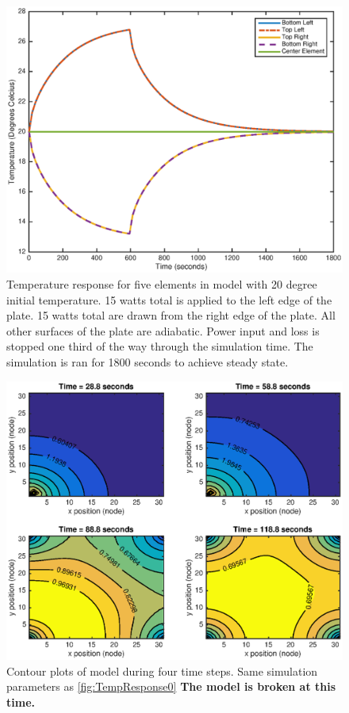\documentclass[10pt,twocolumn]{article}
\begin{document}
\begin{figure}
	\center
	\includegraphics[width=0.8\linewidth]{TmpRspn25x25,15Wleftedge,-15Wrightedge,halftime.eps}
	\caption{Temperature response for five elements in model with 20 degree initial temperature. 15 watts total is applied to the left edge of the plate. 15 watts total are drawn from the right edge of the plate. All other surfaces of the plate are adiabatic. Power input and loss is stopped one third of the way through the simulation time. The simulation is ran for 1800 seconds to achieve steady state.}
	\label{fig:TmpRspn25x25,15Wleftedge,-15Wrightedge,halftime}
\end{figure}


\begin{figure}
	\center
	\includegraphics[width=0.8\linewidth]{ContourTrans0.eps}
	\caption{Contour plots of model during four time steps. Same simulation parameters as \autoref{fig:TempResponse0} \textbf{The model is broken at this time.}}
	\label{fig:ContourTrans0}
\end{figure}
\end{document}
